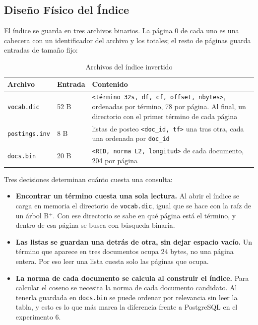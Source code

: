 \subsection{Diseño Físico del Índice}

El índice se guarda en tres archivos binarios. La página 0 de cada uno es una
cabecera con un identificador del archivo y los totales; el resto de páginas
guarda entradas de tamaño fijo:

\begin{table}[H]
\centering
\caption{Archivos del índice invertido}
\begin{tabularx}{\textwidth}{@{}llX@{}}
\toprule
\textbf{Archivo} & \textbf{Entrada} & \textbf{Contenido} \\
\midrule
\texttt{vocab.dic} & 52 B & \texttt{<término 32s, df, cf, offset, nbytes>}, ordenadas por
término, 78 por página. Al final, un directorio con el primer término de cada página \\
\texttt{postings.inv} & 8 B & listas de posteo \texttt{<doc\_id, tf>} una tras otra,
cada una ordenada por \texttt{doc\_id} \\
\texttt{docs.bin} & 20 B & \texttt{<RID, norma L2, longitud>} de cada documento,
204 por página \\
\bottomrule
\end{tabularx}
\end{table}

Tres decisiones determinan cuánto cuesta una consulta:

\begin{itemize}
    \item \textbf{Encontrar un término cuesta una sola lectura.} Al abrir el
    índice se carga en memoria el directorio de \texttt{vocab.dic}, igual que se
    hace con la raíz de un árbol B$^+$. Con ese directorio se sabe en qué página
    está el término, y dentro de esa página se busca con búsqueda binaria.
    \item \textbf{Las listas se guardan una detrás de otra, sin dejar espacio
    vacío.} Un término que aparece en tres documentos ocupa 24 bytes, no una
    página entera. Por eso leer una lista cuesta solo las páginas que ocupa.
    \item \textbf{La norma de cada documento se calcula al construir el índice.}
    Para calcular el coseno se necesita la norma de cada documento candidato. Al
    tenerla guardada en \texttt{docs.bin} se puede ordenar por relevancia sin
    leer la tabla, y esto es lo que más marca la diferencia frente a PostgreSQL
    en el experimento 6.
\end{itemize}

